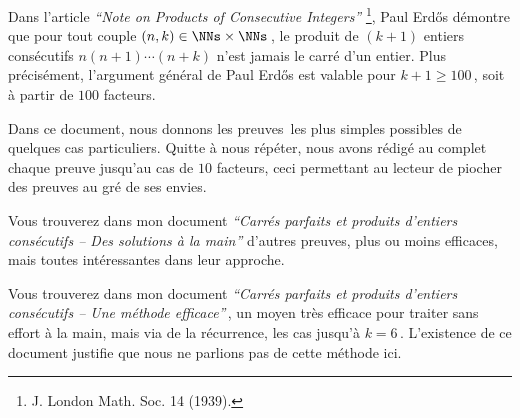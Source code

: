 Dans l'article \emph{\enquote{Note on Products of Consecutive Integers}}
\footnote{
	J. London Math. Soc. 14 (1939).
},
Paul Erdős démontre que pour tout couple $(n, k) \in \NNs \times \NNs$\,, le produit de $(k+1)$ entiers consécutifs $n (n + 1) \cdots (n + k)$ n'est jamais le carré d'un entier. 
Plus précisément, l'argument général de Paul Erdős est valable pour $k + 1 \geq 100$\,, soit à partir de $100$ facteurs.

\medskip

Dans ce document, nous donnons les preuves les plus simples possibles de quelques cas particuliers. Quitte à nous répéter, nous avons rédigé au complet chaque preuve jusqu'au cas de $10$ facteurs, ceci permettant au lecteur de piocher des preuves au gré de ses envies.


\begin{remark}
	Vous trouverez dans mon document \emph{\enquote{Carrés parfaits et produits d'entiers consécutifs -- Des solutions à la main}} d'autres preuves, plus ou moins efficaces, mais toutes intéressantes dans leur approche.
\end{remark}


\begin{remark}
	Vous trouverez dans mon document \emph{\enquote{Carrés parfaits et produits d'entiers consécutifs -- Une méthode efficace}}\,, un moyen très efficace pour traiter sans effort à la main, mais via de la récurrence, les cas jusqu'à $k = 6$\,.
	L'existence de ce document justifie que nous ne parlions pas de cette méthode ici.
\end{remark}

